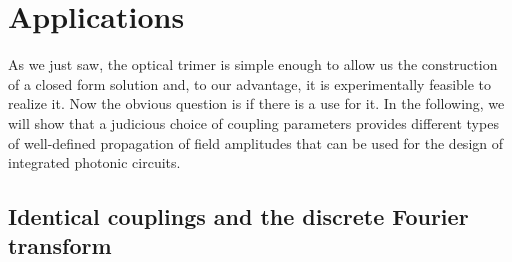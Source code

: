 \documentclass[9pt,twocolumn,twoside]{osajnl}
\begin{document}

\section{Applications}

As we just saw, the optical trimer is simple enough to allow us the construction of a closed form solution and, to our advantage, it is experimentally feasible to realize it.
Now the obvious question is if there is a use for it.
In the following, we will show that a judicious choice of coupling parameters provides  different types of well-defined propagation of field amplitudes that can be used for the design of integrated photonic circuits.


\subsection{Identical couplings and the discrete Fourier transform}
\end{document}
